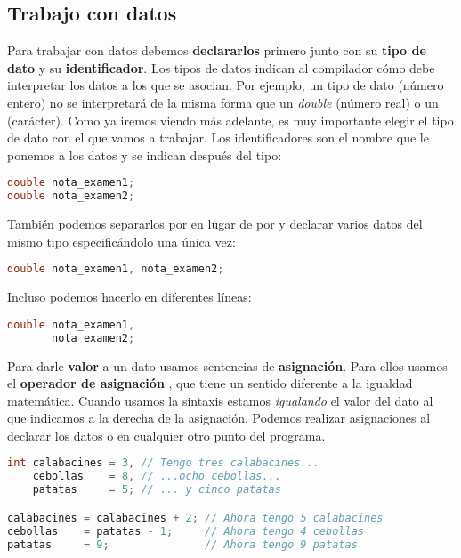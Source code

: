 \subsection{Trabajo con datos}

Para trabajar con datos debemos \textbf{declararlos} primero junto con su \textbf{tipo de dato} y su \textbf{identificador}.
Los tipos de datos indican al compilador cómo debe interpretar los datos a los que se asocian.
Por ejemplo, un tipo de dato  (número entero) no se interpretará de la misma forma que un \textit{double} (número real) o un  (carácter).
Como ya iremos viendo más adelante, es muy importante elegir el tipo de dato con el que vamos a trabajar.
Los identificadores son el nombre que le ponemos a los datos y se indican después del tipo:

\begin{lstlisting}[language=C++]
double nota_examen1;
double nota_examen2;
\end{lstlisting}

También podemos separarlos por \code{,} en lugar de por \code{;} y declarar varios datos del mismo tipo especificándolo una única vez:

\begin{lstlisting}[language=C++]
double nota_examen1, nota_examen2;
\end{lstlisting}

Incluso podemos hacerlo en diferentes líneas:

\begin{lstlisting}[language=C++]
double nota_examen1,
       nota_examen2;
\end{lstlisting}

Para darle \textbf{valor} a un dato usamos sentencias de \textbf{asignación}.
Para ellos usamos el \textbf{operador de asignación} \code{=}, que tiene un sentido diferente a la igualdad matemática.
Cuando usamos la sintaxis  estamos \textit{igualando} el valor del dato al  que indicamos a la derecha de la asignación.
Podemos realizar asignaciones al declarar los datos o en cualquier otro punto del programa.

\begin{lstlisting}[language=C++]
int calabacines = 3, // Tengo tres calabacines...
    cebollas    = 8, // ...ocho cebollas...
    patatas     = 5; // ... y cinco patatas

calabacines = calabacines + 2; // Ahora tengo 5 calabacines
cebollas    = patatas - 1;     // Ahora tengo 4 cebollas
patatas     = 9;               // Ahora tengo 9 patatas
\end{lstlisting}

